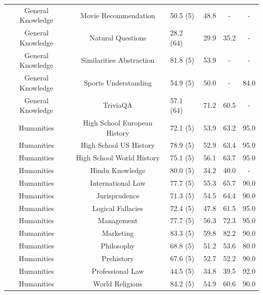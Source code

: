\documentclass[11pt, a4paper, logo, internal, copyright, nonumbering]{deepmind}
\begin{document}
\begin{center}
\begin{longtable}{cclccc}
      General Knowledge &                  Movie Recommendation &   50.5 (5) &  48.8 &   - &          - \\
      General Knowledge &                    Natural Questions &   28.2 (64) &  29.9 &  35.2 &          - \\
      General Knowledge &              Similarities Abstraction &   81.8 (5) &  53.9 &   - &          - \\
      General Knowledge &                  Sports Understanding &   54.9 (5) &  50.0 &   - &         84.0 \\
      General Knowledge &                             TriviaQA &   57.1 (64) &  71.2 &  60.5 &          - \\
             Humanities &         High School European History &   72.1 (5) &  53.9 &  63.2 &         95.0 \\
             Humanities &               High School US History &   78.9 (5) &  52.9 &  63.4 &         95.0 \\
             Humanities &            High School World History &   75.1 (5) &  56.1 &  63.7 &         95.0 \\
             Humanities &                     Hindu Knowledge &   80.0 (5) &  34.2 &  40.0 &          - \\
             Humanities &                    International Law &   77.7 (5) &  55.3 &  65.7 &         90.0 \\
             Humanities &                        Jurisprudence &   71.3 (5) &  54.5 &  64.4 &         90.0 \\
             Humanities &                    Logical Fallacies &   72.4 (5) &  47.8 &  61.5 &         95.0 \\
             Humanities &                           Management &   77.7 (5) &  56.3 &  72.3 &         95.0 \\
             Humanities &                            Marketing &   83.3 (5) &  59.8 &  82.2 &         90.0 \\
             Humanities &                           Philosophy &   68.8 (5) &  51.2 &  53.6 &         80.0 \\
             Humanities &                           Prehistory &   67.6 (5) &  52.7 &  52.2 &         90.0 \\
             Humanities &                     Professional Law &   44.5 (5) &  34.8 &  39.5 &         92.0 \\
             Humanities &                      World Religions &   84.2 (5) &  54.9 &  60.6 &         90.0 \\

\end{longtable}
\end{center}
\end{document}
